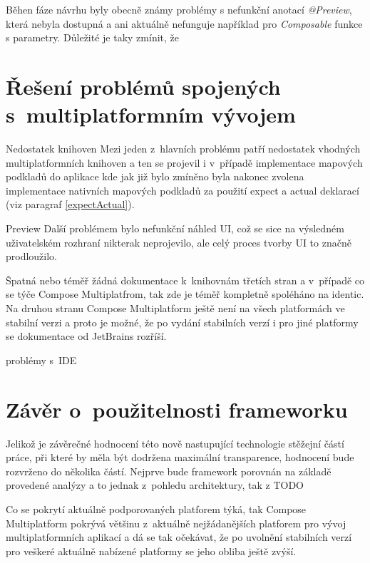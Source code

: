 Běhen fáze návrhu byly obecně známy problémy s nefunkční anotací \textit{@Preview}, která nebyla dostupná a ani aktuálně nefunguje například pro 
\textit{Composable} funkce s parametry. \cite{previewCompose} Důležité je taky zmínit, že 

\section{Řešení problémů spojených s~multiplatformním vývojem} %
Nedostatek knihoven
Mezi jeden z~hlavních problému patří nedostatek vhodných multiplatformních knihoven a ten se projevil i v~případě implementace mapových podkladů
do aplikace kde jak již bylo zmíněno byla nakonec zvolena implementace nativních mapových podkladů za použití expect a actual deklarací (viz paragraf \ref{expectActual}).

Preview
Další problémem bylo nefunkční náhled UI, což se sice na výsledném uživatelském rozhraní nikterak neprojevilo, ale celý proces tvorby UI to značně 
prodloužilo.

Špatná nebo téměř žádná dokumentace k~knihovnám třetích stran a v~případě co se týče Compose Multiplatfrom, tak zde je téměř kompletně spoléháno na
identic. 
Na druhou stranu Compose Multiplatform ještě není na všech platformách ve stabilní verzi a proto je možné, že po vydání stabilních verzí i pro jiné
platformy se dokumentace od JetBrains rozříší.

problémy s~IDE 

\section{Závěr o~použitelnosti frameworku}
Jelikož je závěrečné hodnocení této nově nastupující technologie stěžejní částí práce, při které by měla být dodržena maximální 
transparence, hodnocení bude rozvrženo do několika částí. Nejprve bude framework porovnán na základě provedené analýzy a to jednak 
z~pohledu architektury, tak z TODO


Co se pokrytí aktuálně podporovaných platforem týká, tak Compose Multiplatform pokrývá většinu z~aktuálně nejžádanějších platforem pro 
vývoj multiplatformních aplikací a dá se tak očekávat, že po uvolnění stabilních verzí pro veškeré aktuálně nabízené platformy se 
jeho obliba ještě zvýší.



